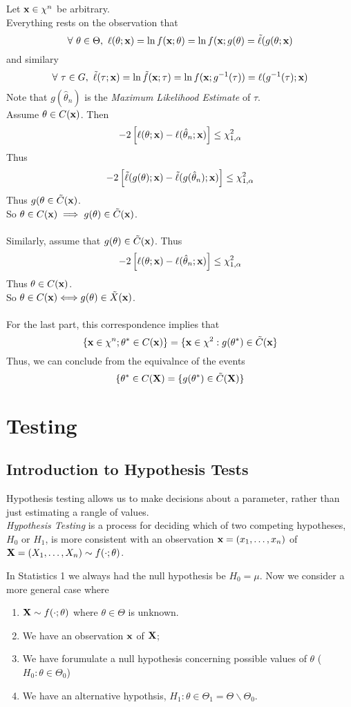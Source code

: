 \documentclass[11pt,a4paper]{article}
\begin{document}
Let $\textbf{x}\in\chi^n$ be arbitrary.\\
Everything rests on the observation that
$$\forall\ \theta\in\Theta,\ \ell(\theta;\textbf{x})=\ln f(\textbf{x};\theta)=\ln f(\textbf{x};g(\theta)=\tilde\ell(g(\theta;\textbf{x})$$
and similary
$$\forall\ \tau\in G,\ \tilde\ell(\tau;\x)=\ln \tilde{f}(\x;\tau)=\ln f(\x;g^{-1}(\tau))=\ell(g^{-1}(\tau);\x)$$
Note that $g(\hat\theta_n)$ is the \textit{Maximum Likelihood Estimate} of $\tau$.\\
Assume $\theta\in C(\textbf{x})$. Then
$$-2\left[\ell(\theta;\textbf{x})-\ell(\hat\theta_n;\textbf{x})\right]\leq\chi^2_{1,\alpha}$$
Thus
$$-2\left[\tilde\ell(g(\theta);\textbf{x})-\tilde\ell(g(\hat\theta_n);\textbf{x})\right]\leq\chi^2_{1,\alpha}$$
Thus $g(\theta\in\tilde{C}(\textbf{x})$.\\
So $\theta\in C(\textbf{x})\implies g(\theta)\in\tilde{C}(\textbf{x})$.\\
\\
Similarly, assume that $g(\theta)\in\tilde{C}(\textbf{x})$. Thus
$$-2\left[\ell(\theta;\textbf{x})-\ell(\hat\theta_n;\textbf{x})\right]\leq\chi^2_{1,\alpha}$$
Thus $\theta\in C(\textbf{x})$.\\
So $\theta\in C(\textbf{x})\Longleftrightarrow g(\theta)\in\tilde{X}(\textbf{x})$.\\
\\
For the last part, this correspondence implies that
$$\{\textbf{x}\in\chi^n;\theta^*\in C(\textbf{x})\}=\{\textbf{x}\in\chi^2:g(\theta^*)\in\tilde{C}(\textbf{x}\}$$
Thus, we can conclude from the equivalnce of the events
$$\{\theta^*\in C(\textbf{X})=\{g(\theta^*)\in\tilde{C}(\textbf{X})\}$$

\section{Testing}

\subsection{Introduction to Hypothesis Tests}

Hypothesis testing allows us to make decisions about a parameter, rather than just estimating a rangle of values.\\

\textit{Hypothesis Testing} is a process for deciding which of two competing hypotheses, $H_0$ or $H_1$, is more consistent with an observation $\textbf{x}=(x_1,\dots,x_n)$ of $\textbf{X}=(X_1,\dots,X_n)\sim f(\cdot;\theta)$.

In Statistics 1 we always had the null hypothesis be $H_0=\mu$. Now we consider a more general case where
\begin{enumerate}[label=\roman*)]
	\item $\textbf{X}\sim f(\cdot;\theta)$ where $\theta\in\Theta$ is unknown.
	\item We have an observation $\textbf{x}$ of $\textbf{X}$;
	\item We have forumulate a null hypothesis concerning possible values of $\theta$ (\eg $H_0:\theta\in\Theta_0$)
	\item We have an alternative hypothsis, $H_1:\theta\in\Theta_1=\Theta\backslash\Theta_0$.
\end{enumerate}
\end{document}
